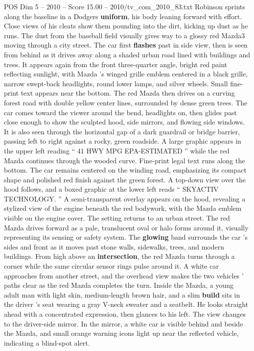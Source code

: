 \begin{textsample}{POS Dim 5 – 2010 – Score 15.00 – 2010/tv\_com\_2010\_83.txt}
Robinson sprints along the baseline in a Dodgers \textbf{uniform}, his body leaning forward with effort.
Close views of his cleats show them pounding into the dirt, kicking up dust as he runs.
The dust from the baseball field visually gives way to a glossy red Mazda3 moving through a city street.
The car first \textbf{flashes} past in side view, then is seen from behind as it drives away along a shaded urban road lined with buildings and trees.
It appears again from the front three-quarter angle, bright red paint reflecting sunlight, with Mazda ’s winged grille emblem centered in a black grille, narrow swept-back headlights, round lower lamps, and silver wheels.
Small fine-print text appears near the bottom.
The red Mazda then drives on a curving forest road with double yellow center lines, surrounded by dense green trees.
The car comes toward the viewer around the bend, headlights on, then glides past close enough to show the sculpted hood, side mirrors, and flowing side windows.
It is also seen through the horizontal gap of a dark guardrail or bridge barrier, passing left to right against a rocky, green roadside.
A large graphic appears in the upper left reading “ 41 HWY MPG EPA-ESTIMATED ” while the red Mazda continues through the wooded curve.
Fine-print legal text runs along the bottom.
The car remains centered on the winding road, emphasizing its compact shape and polished red finish against the green forest.
A top-down view over the hood follows, and a boxed graphic at the lower left reads “ SKYACTIV TECHNOLOGY. ” A semi-transparent overlay appears on the hood, revealing a stylized view of the engine beneath the red bodywork, with the Mazda emblem visible on the engine cover.
The setting returns to an urban street.
The red Mazda drives forward as a pale, translucent oval or halo forms around it, visually representing its sensing or safety system.
The \textbf{glowing} band surrounds the car ’s sides and front as it moves past stone walls, sidewalks, trees, and modern buildings.
From high above an \textbf{intersection}, the red Mazda turns through a corner while the same circular sensor rings pulse around it.
A white car approaches from another street, and the overhead view makes the two vehicles ’ paths clear as the red Mazda completes the turn.
Inside the Mazda, a young adult man with light skin, medium-length brown hair, and a slim \textbf{build} sits in the driver ’s seat wearing a gray V-neck sweater and a seatbelt.
He looks straight ahead with a concentrated expression, then glances to his left.
The view changes to the driver-side mirror.
In the mirror, a white car is visible behind and beside the Mazda, and small orange warning icons light up near the reflected vehicle, indicating a blind-spot alert.

\end{textsample}
